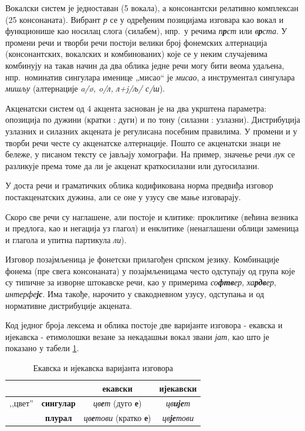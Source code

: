 \begin{multicols}{2}
Вокалски систем је једноставан (5 вокала), а консонантски релативно комплексан (25 консонаната). Вибрант \textit{р} се у одређеним позицијама изговара као вокал и функционише као носилац слога (силабем), нпр.~у речима \textit{п\textbf{р}ст} или \textit{в\textbf{р}ста}. У промени речи и творби речи постоји велики број фонемских алтернација (консонантских, вокалских и комбинованих) које се у неким случајевима комбинују на такав начин да два облика једне речи могу бити веома удаљена, нпр.~номинатив сингулара именице „мисао“ је \textit{мисао}, а инструментал сингулара \textit{мишљу} (алтернације \textit{a/\o{}, o/л, л+j/љ/ с/ш}).

Акценатски систем од 4 акцента заснован је на два укрштена параметра: опозиција по дужини  (кратки : дуги) и по тону (силазни : узлазни).  Дистрибуција узлазних и силазних акцената је регулисана посебним правилима. У промени и у творби речи честе су акценатске алтернације. Пошто се акценатски знаци не бележе, у писаном тексту се јављају хомографи. На пример, значење речи \textit{лук} се разликује према томе да ли је акценат краткосилазни или дугосилазни.

У доста речи и граматичких облика кодификована норма предвиђа изговор постакценатских дужина, али се оне у узусу све мање изговарају.

Скоро све речи су наглашене, али постоје и клитике: проклитике (већина везника и предлога, као и негација уз глагол) и енклитике (ненаглашени облици заменица и глагола и упитна партикула \textit{ли}).

Изговор позајмљеница је фонетски прилагођен српском језику. Комбинације фонема (пре свега консонаната) у позајмљеницама често одступају од група које су типичне за изворне штокавске речи, као у примерима \textit{со\textbf{фтв}ер}, \textit{ха\textbf{рдв}ер}, \textit{интерфе\textbf{јс}}. Има такође, нарочито у свакодневном узусу, одступања и од нормативне дис\-три\-бу\-ци\-је акцената.

Код једног броја лексема и облика постоје две варијанте изговора - екавска и ијекавска - етимолошки везане за некадашњи вокал звани \textit{јат}, као што је показано у табели \ref{ekavski_ijekavski}. 


\begin{table}[ht]
\begin{center}
\begin{tabular}{|c|c|c|c|}
 \hline
  \multicolumn{2}{|c|}{} & {\textbf{екавски}} & {\textbf{ијекавски}} \\ 
   \hline
  {,,цвет''} & {\textbf{сингулар}} & \textit{цв\textbf{е}т} (дуго \textbf{е}) & \textit{цв\textbf{ије}т}\\ 
   \cline{2-4}
     & {\textbf{плурал}} & \textit{цв\textbf{е}тови} (кратко \textbf{е}) & \textit{цв\textbf{је}тови} \\
  \hline
 \end{tabular}
\end{center}
\caption{Екавска и ијекавска варијанта изговора}
\label{ekavski_ijekavski}
\end{table}


\end{multicols}

